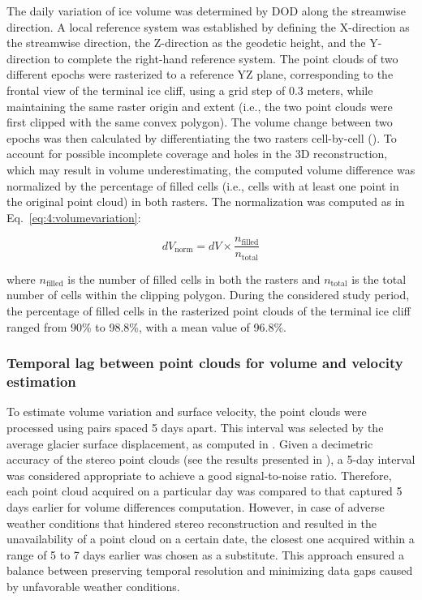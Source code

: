 The daily variation of ice volume was determined by DOD along the streamwise direction. 
A local reference system was established by defining the X-direction as the streamwise direction, the Z-direction as the geodetic height, and the Y-direction to complete the right-hand reference system.
The point clouds of two different epochs were rasterized to a reference YZ plane,
corresponding to the frontal view of the terminal ice cliff, using a grid step of 0.3
meters, while maintaining the same raster origin and extent (i.e., the two point clouds
were first clipped with the same convex polygon).
The volume change between two epochs was then calculated by differentiating the
two rasters cell-by-cell ().
To account for possible incomplete coverage and holes in the 3D reconstruction, which may
result in volume underestimating, the computed volume difference was normalized by the
percentage of filled cells (i.e., cells with at least one point in the original point
cloud) in both rasters.
The normalization was computed as in Eq.~\ref{eq:4:volumevariation}:

\begin{equation}
  dV_{\text{norm}} = dV \times
  \frac{n_{\text{filled}}}{n_{\text{total}}}
  \label{eq:4:volumevariation}
\end{equation}

where \( n_{\text{filled}} \) is the number of filled cells in both the rasters and \(
n_{\text{total}} \) is the total number of cells within the clipping polygon.
During the considered study period, the percentage of filled cells in the rasterized
point clouds of the terminal ice cliff ranged from 90\% to
98.8\%, with a mean value of 96.8\%.


\subsubsection{Temporal lag between point clouds for volume and velocity estimation}
\label{sec:4:timelag}

To estimate volume variation and surface velocity, the point clouds were processed using pairs spaced 5 days apart.
This interval was selected by the average glacier surface displacement, as computed in .
Given a decimetric accuracy of the stereo point clouds (see the results presented in ), a 5-day interval was considered appropriate to achieve a good signal-to-noise ratio.
Therefore, each point cloud acquired on a particular day was compared to that captured 5 days earlier for volume differences computation.
However, in case of adverse weather conditions that hindered stereo reconstruction and resulted in the unavailability of a point cloud on a certain date, the closest one acquired within a range of 5 to 7 days earlier was chosen as a substitute.
This approach ensured a balance between preserving temporal resolution and minimizing data gaps caused by unfavorable weather conditions.

